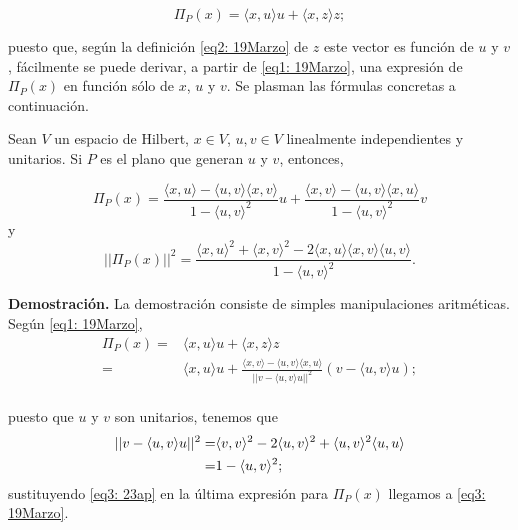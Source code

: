 \begin{equation}
\label{eq1: 19Marzo}
\Pi_{P}(x)= \langle x, u \rangle u + \langle x, z \rangle z;
\end{equation}

\noindent
puesto que, según la definición \eqref{eq2: 19Marzo} de 
$z$ este vector es función de $u$ y $v$, fácilmente se
puede derivar, a partir de \eqref{eq1: 19Marzo},
una expresión de $\Pi_{P}(x)$ en función sólo
de $x$, $u$ y $v$. Se plasman las fórmulas 
concretas a continuación.
	\begin{prop}
	\label{prop: formulas 20Marzo}
	Sean $V$ un espacio de Hilbert, $x \in V$,
	$u,v \in V$ linealmente independientes
	y unitarios. Si $P$ es el plano
	que generan $u$ y $v$, entonces,

		\begin{equation}
		\label{eq0: 24ap}
		\Pi_{P}(x)= \frac{\langle x, u \rangle -\langle u, v \rangle \langle x, v \rangle }{1-\langle u, v \rangle^{2}} u + \frac{\langle x, v \rangle -\langle u, v \rangle \langle x, u \rangle }{1-\langle u, v \rangle^{2}} v
		\end{equation}
	y 
		\begin{equation}
		\label{eq3: 19Marzo}
		  || \Pi_{P}(x) ||^{2}=
		  \frac{\langle x, u \rangle^{2} +  \langle x, v \rangle^{2}	
	       -2  \langle x, u \rangle \langle x, v \rangle \langle u, v \rangle	}{1- \langle u, v 		\rangle^{2}}.
		\end{equation}
 
	\end{prop}

\noindent
\textbf{Demostración.}
La demostración consiste de simples manipulaciones aritméticas.
Según \eqref{eq1: 19Marzo},
\begin{align*}
\Pi_{P}(x) = & \langle x, u \rangle u + \langle x, z \rangle z \\
 = & \langle x, u \rangle u
 + \frac{\langle x, v \rangle - \langle u, v \rangle \langle x, u \rangle}{|| v -\langle u,v \rangle u ||^{2}}
(v - \langle u,v \rangle u);\\
\end{align*}

\noindent
puesto que $u$ y $v$ son unitarios, 
tenemos que
\begin{align}
\label{eq3: 23ap}
|| v -\langle u,v \rangle u ||^{2} = & 
\langle v,v \rangle^{2} -2
\langle u,v \rangle^{2} +\langle u,v \rangle^{2}\langle u,u \rangle \notag  \\
= & 1 -\langle u,v \rangle^{2}; 
\end{align}
sustituyendo \eqref{eq3: 23ap} en la última expresión para 
$\Pi_{P}(x)$ llegamos a \eqref{eq3: 19Marzo}. \\

